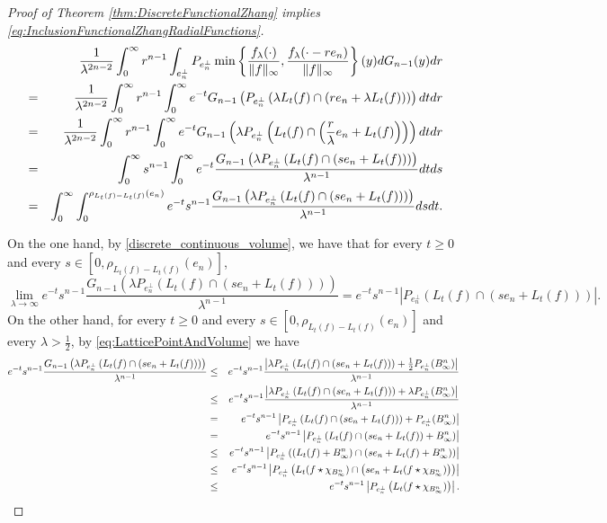 \documentclass{amsart}
\theoremstyle{remark}
\theoremstyle{definition}
\numberwithin{equation}{section}
\begin{document}
\begin{proof}[Proof of Theorem \ref{thm:DiscreteFunctionalZhang} implies \eqref{eq:InclusionFunctionalZhangRadialFunctions}]
\begin{eqnarray*}
&&\frac{1}{\lambda^{2n-2}}\int_0^\infty r^{n-1}\int_{e_n^\perp}P_{e_n^\perp}\min\left\{\frac{f_\lambda(\cdot)}{\Vert f\Vert_\infty},\frac{f_\lambda(\cdot-re_n)}{\Vert f\Vert_\infty}\right\}(y)dG_{n-1}(y)dr\cr
&=&\frac{1}{\lambda^{2n-2}}\int_0^\infty r^{n-1}\int_0^\infty e^{-t} G_{n-1}\left(P_{e_n^\perp}\left(\lambda L_t(f)\cap\left(r e_n+\lambda L_t(f)\right)\right)\right)dtdr\cr
&=&\frac{1}{\lambda^{2n-2}}\int_0^\infty r^{n-1}\int_0^\infty e^{-t} G_{n-1}\left(\lambda P_{e_n^\perp}\left(L_t(f)\cap\left(\frac{r}{\lambda} e_n+ L_t(f)\right)\right)\right)dtdr\cr
&=&\int_0^\infty s^{n-1}\int_0^\infty e^{-t} \frac{G_{n-1}\left(\lambda P_{e_n^\perp}\left(L_t(f)\cap\left(se_n+ L_t(f)\right)\right)\right)}{\lambda^{n-1}}dtds\cr
&=&\int_0^\infty \int_0^{\rho_{L_t(f)-L_t(f)}(e_n)}e^{-t}s^{n-1} \frac{G_{n-1}\left(\lambda P_{e_n^\perp}\left(L_t(f)\cap\left(se_n+ L_t(f)\right)\right)\right)}{\lambda^{n-1}}dsdt.\cr
\end{eqnarray*}


On the one hand, by \eqref{discrete_continuous_volume}, we have that for every $t\geq0$ and every $s\in[0,\rho_{L_t(f)-L_t(f)}(e_n)]$,
$$
\lim_{\lambda\to\infty}e^{-t}s^{n-1}\frac{G_{n-1}\left(\lambda P_{e_n^\perp}\left(L_t(f)\cap\left(se_n+ L_t(f)\right)\right)\right)}{\lambda^{n-1}}=e^{-t}s^{n-1}|P_{e_n^\perp}(L_t(f)\cap (se_n+L_t(f)))|.
$$
On the other hand, for every $t\geq0$ and every $s\in[0,\rho_{L_t(f)-L_t(f)}(e_n)]$ and every $\lambda>\frac{1}{2}$, by \eqref{eq:LatticePointAndVolume} we have
\begin{eqnarray*}
e^{-t}s^{n-1}\frac{G_{n-1}\left(\lambda P_{e_n^\perp}\left(L_t(f)\cap\left(se_n+ L_t(f)\right)\right)\right)}{\lambda^{n-1}}&\leq&e^{-t}s^{n-1}\frac{\left|\lambda P_{e_n^\perp}\left(L_t(f)\cap\left(se_n+ L_t(f)\right)\right)+\frac{1}{2}P_{e_n^\perp}(B_\infty^n)\right|}{\lambda^{n-1}}\cr
&\leq&e^{-t}s^{n-1}\frac{\left|\lambda P_{e_n^\perp}\left(L_t(f)\cap\left(se_n+ L_t(f)\right)\right)+\lambda P_{e_n^\perp}(B_\infty^n)\right|}{\lambda^{n-1}}\cr
&=&e^{-t}s^{n-1}\left|P_{e_n^\perp}\left(L_t(f)\cap\left(se_n+ L_t(f)\right)\right)+P_{e_n^\perp}(B_\infty^n)\right|\cr
&=&e^{-t}s^{n-1}\left|P_{e_n^\perp}\left(L_t(f)\cap\left(se_n+ L_t(f)\right)+B_\infty^n\right)\right|\cr
&\leq&e^{-t}s^{n-1}\left|P_{e_n^\perp}\left((L_t(f)+B_\infty^n)\cap\left(se_n+ L_t(f)+B_\infty^n\right)\right)\right|\cr
&\leq&e^{-t}s^{n-1}\left|P_{e_n^\perp}\left(L_t(f\star\chi_{B_\infty^n})\cap\left(se_n+ L_t(f\star\chi_{B_\infty^n})\right)\right)\right|\cr
&\leq&e^{-t}s^{n-1}\left|P_{e_n^\perp}\left(L_t(f\star\chi_{B_\infty^n})\right)\right|.\cr
\end{eqnarray*}


\end{proof}
\end{document}
